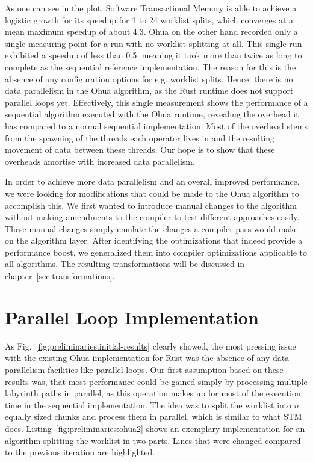 As one can see in the plot, Software Transactional Memory is able to achieve a logistic growth for its speedup for 1 to 24 worklist splits, which converges at a mean maximum speedup of about 4.3.
Ohua on the other hand recorded only a single measuring point for a run with no worklist splitting at all.
This single run exhibited a speedup of less than 0.5, meaning it took more than twice as long to complete as the sequential reference implementation.
The reason for this is the absence of any configuration options for e.g. worklist splits.
Hence, there is no data parallelism in the Ohua algorithm, as the Rust runtime does not support parallel loops yet.
Effectively, this single measurement shows the performance of a sequential algorithm executed with the Ohua runtime, revealing the overhead it has compared to a normal sequential implementation.
Most of the overhead stems from the spawning of the threads each operator lives in and the resulting movement of data between these threads.
Our hope is to show that these overheads amortise with increased data parallelism.

In order to achieve more data parallelism and an overall improved performance, we were looking for modifications that could be made to the Ohua algorithm to accomplish this.
We first wanted to introduce manual changes to the algorithm without making amendments to the compiler to test different approaches easily.
These manual changes simply emulate the changes a compiler pass would make on the algorithm layer.
After identifying the optimizations that indeed provide a performance boost, we generalized them into compiler optimizations applicable to all algorithms.
The resulting transformations will be discussed in chapter~\ref{sec:transformations}.


\section{Parallel Loop Implementation}%
\label{sec:preliminary:tf1}

As Fig.~\ref{fig:preliminaries:initial-results} clearly showed, the most pressing issue with the existing Ohua implementation for Rust was the absence of any data parallelism facilities like parallel loops.
Our first assumption based on these results was, that most performance could be gained simply by processing multiple labyrinth paths in parallel, as this operation makes up for most of the execution time in the sequential implementation.
The idea was to split the worklist into $n$ equally sized chunks and process them in parallel, which is similar to what STM does.
Listing~\ref{fig:preliminaries:ohua2} shows an exemplary implementation for an algorithm splitting the worklist in two parts.
Lines that were changed compared to the previous iteration are highlighted.

